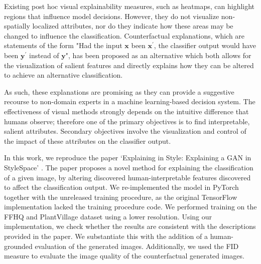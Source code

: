 \begin{comment}
In recent years, many machine learning algorithms have been designed to be black-box algorithms -- systems where everything is known about the inputs and the outputs, but little about the internal logic to the user. The lack of explanation introduces both a practical and an ethical issue and has hindered the large-scale deployment of these models \cite{guidotti2018survey}. 
\end{comment}

Existing post hoc visual explainability measures, such as heatmaps\cite{8237336}, can highlight regions that influence model decisions. However, they do not visualize non-spatially localized attributes, nor do they indicate how these areas may be changed to influence the classification. Counterfactual explanations, which are statements of the form "Had the input $\mathbf{x}$ been $\mathbf{x^{\prime}}$, the classifier output would have been $\mathbf{y^{\prime}}$ instead of $\mathbf{y}$", has been proposed as an alternative which both allows for the visualization of salient features and directly explains how they can be altered to achieve an alternative classification. 

As such, these explanations are promising as they can provide a suggestive recourse to non-domain experts in a machine learning-based decision system. The effectiveness of visual methods strongly depends on the intuitive difference that humans observe; therefore one of the primary objectives is to find interpretable, salient attributes. Secondary objectives involve the visualization and control of the impact of these attributes on the classifier output. 

In this work, we reproduce the paper ‘Explaining in Style: Explaining a GAN in StyleSpace’ \cite{explaining_in_style}. The paper proposes a novel method for explaining the classification of a given image, by altering discovered human-interpretable features discovered to affect the classification output. We re-implemented the model in PyTorch together with the unreleased training procedure, as the original TensorFlow implementation lacked the training procedure code. We performed training on the FFHQ and PlantVillage dataset using a lower resolution. Using our implementation, we check whether the results are consistent with the descriptions provided in the paper. We substantiate this with the addition of a human-grounded evaluation of the generated images. Additionally, we used the FID measure to evaluate the image quality of the counterfactual generated images.



